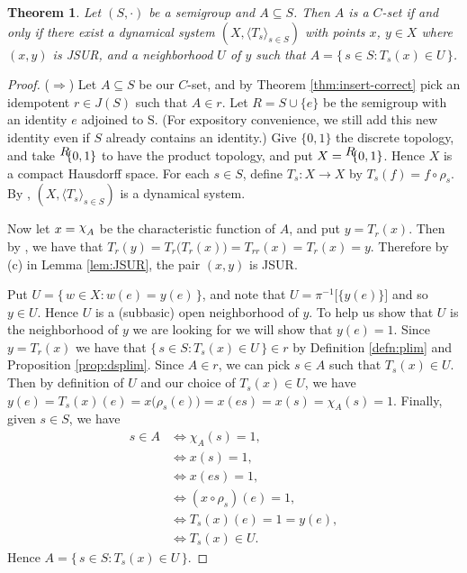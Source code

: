 \documentclass[12pt]{article}
\theoremstyle{plain}
\newtheorem{thm}{Theorem}[section]
\theoremstyle{definition}
\newcommand{\la}{\langle}
\newcommand{\ra}{\rangle}
\newcommand{\ds}{(X, \la T_s \ra_{s\in S})}
\newcommand{\setfunc}[2]{\hbox{${}^{\hbox{$#1$}}\hskip -3 pt #2$}}
\newcommand{\cchi}{\raise 2 pt \hbox{$\chi$}}
\begin{document}
  \begin{thm}
    \label{thm:dyncsets}
    Let $(S,\cdot)$ be a semigroup and $A \subseteq S$. 
    Then $A$ is a $C$-set if and only if there exist a dynamical
    system $\ds$ with points $x$, $y \in X$ where $(x,y)$ is JSUR, and
    a neighborhood $U$ of $y$ such that $A = \{\, s \in S : T_s(x) \in
    U \,\}$.
  \end{thm}
  \begin{proof}
    ($\Rightarrow$) Let $A \subseteq S$ be our $C$-set, and by
    Theorem \ref{thm:insert-correct} pick an idempotent $r \in J(S)$ such that
    $A \in r$. 
    Let $R = S \cup \{e\}$ be the semigroup with an identity $e$
    adjoined to S. 
    (For expository convenience, we still add this new identity even
    if $S$ already contains an identity.)
    Give $\{0,1\}$ the discrete topology, and take
    $\setfunc{R}{\{0,1\}}$ to have
    the product topology, and put $X = \setfunc{R}{\{0,1\}}$.
    Hence $X$ is a compact Hausdorff space.
    For each $s \in S$, define $T_s : X \to X$ by $T_s(f) = f \circ
    \rho_s$. 
    By \cite[Theorem 19.14]{Hindman:1998fk}, $\ds$ is a dynamical
    system. 
    
    Now let $x = \cchi_A$ be the characteristic function of $A$, and
    put $y = T_r(x)$.
    Then by \cite[Remark 19.13]{Hindman:1998fk}, we have that $T_r(y)
    = T_r\bigl(T_r(x)\bigr) = T_{rr}(x) = T_r(x) = y$.
    Therefore by (c) in Lemma \ref{lem:JSUR}, the pair $(x, y)$ is JSUR.

    Put $U = \{\, w \in X : w(e) = y(e) \,\}$, and note that $U =
    \pi^{-1}\bigl[\{y(e)\}\bigr]$ and so $y \in U$. 
    Hence $U$ is a (subbasic) open neighborhood of $y$.
    To help us show that $U$ is the neighborhood of $y$ we are looking
    for we will show that $y(e) = 1$.
    Since $y = T_r(x)$ we have that $\{\, s \in S : T_s(x) \in U \,\}
    \in r$ by Definition \ref{defn:plim} and Proposition \ref{prop:dsplim}.
    Since $A \in r$, we can pick $s \in A$ such that $T_s(x) \in U$. 
    Then by definition of $U$ and our choice of $T_s(x) \in U$, we
    have $y(e) = T_s(x)(e) = x\bigl(\rho_s(e)\bigr) = x(es) = x(s) =
    \chi_{A}(s) = 1$. 
    Finally, given $s \in S$, we have
      \begin{align*}
        s \in A &\iff \chi_{A}(s) = 1, \\
                &\iff x(s) = 1, \\
                &\iff x(es) = 1, \\
                &\iff (x \circ \rho_s)(e) = 1, \\
                &\iff T_s(x)(e) = 1 = y(e), \\
                &\iff T_s(x) \in U.
      \end{align*}
   Hence $A = \{\, s \in S : T_s(x) \in U \,\}$. 
   

\end{proof}
\end{document}
